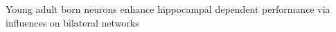 Young adult born neurons enhance hippocampal dependent performance via influences on bilateral networks

